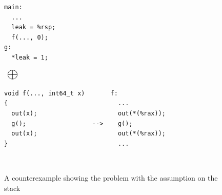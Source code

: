\begin{figure}[t]
\hspace*{-1.9mm}
\begin{minipage}{0.255\textwidth}
  \begin{Verbatim}[frame=single]
main:
  ...  
  leak = %rsp;
  f(..., 0);
g:
  *leak = 1;
  \end{Verbatim}
\end{minipage}
$\mbox{}~\mathlarger{\mathlarger{\mathlarger{\mathlarger{\mathlarger{\llink}}}}}~\mbox{}$
\hspace*{-1.9mm}
\begin{minipage}{0.595\textwidth}
  \begin{Verbatim}[frame=single]
void f(..., int64_t x)       f:
{                              ...
  out(x);                      out(*(%rax));
  g();                  -->    g();
  out(x);                      out(*(%rax));
}                              ...
  \end{Verbatim}
\end{minipage}
\\[1mm]
\hspace*{-1.9mm}
\begin{minipage}{.95\textwidth}
\end{minipage}
\caption{A counterexample showing the problem with the assumption on the stack}
\label{fig:stack-convention}
\end{figure}

